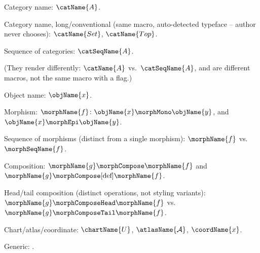 \documentclass{article}
\begin{document}
Category name: $\catName{A}$.

Category name, long/conventional (same macro, auto-detected
typeface -- author never chooses): $\catName{Set}$, $\catName{Top}$.

Sequence of categories: $\catSeqName{A}$.

(They render differently: $\catName{A}$ vs.\ $\catSeqName{A}$, and are
different macros, not the same macro with a flag.)

Object name: $\objName{x}$.

Morphism: $\morphName{f} \colon \objName{x} \morphMono \objName{y}$,
and $\objName{x} \morphEpi \objName{y}$.

Sequence of morphisms (distinct from a single morphism):
$\morphName{f}$ vs.\ $\morphSeqName{f}$.

Composition: $\morphName{g} \morphCompose \morphName{f}$ and
$\morphName{g} \morphCompose[\text{def}] \morphName{f}$.

Head/tail composition (distinct operations, not styling variants):
$\morphName{g} \morphComposeHead \morphName{f}$ vs.\
$\morphName{g} \morphComposeTail \morphName{f}$.

Chart/atlas/coordinate: $\chartName{U}$, $\atlasName{\mathcal{A}}$,
$\coordName{x}$.

Generic: .
\end{document}
